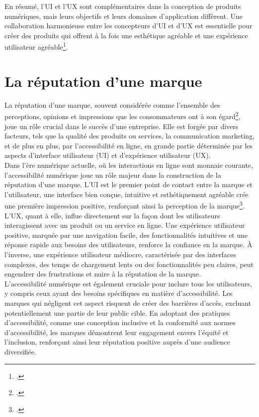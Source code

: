 \documentclass[12pt, a4paper]{report}
\begin{document}
En résumé, l'UI et l'UX sont complémentaires dans la conception de produits numériques, mais leurs objectifs et leurs domaines d'application diffèrent. Une collaboration harmonieuse entre les concepteurs d'UI et d'UX est essentielle pour créer des produits qui offrent à la fois une esthétique agréable et une expérience utilisateur agréable\footcite{ardito_investigating_2014}.

\section{La réputation d'une marque}

La réputation d'une marque, souvent considérée comme l'ensemble des perceptions, opinions et impressions que les consommateurs ont à son égard\footcite{boistel_reputation_2008}, joue un rôle crucial dans le succès d'une entreprise. Elle est forgée par divers facteurs, tels que la qualité des produits ou services, la communication marketing, et de plus en plus, par l'accessibilité en ligne, en grande partie déterminée par les aspects d'interface utilisateur (UI) et d'expérience utilisateur (UX).\\

Dans l'ère numérique actuelle, où les interactions en ligne sont monnaie courante, l'accessibilité numérique joue un rôle majeur dans la construction de la réputation d'une marque. L'UI est le premier point de contact entre la marque et l'utilisateur, une interface bien conçue, intuitive et esthétiquement agréable crée une première impression positive, renforçant ainsi la perception de la marque\footcite{barcella_initiation_nodate}.\\

L'UX, quant à elle, influe directement sur la façon dont les utilisateurs interagissent avec un produit ou un service en ligne. Une expérience utilisateur positive, marquée par une navigation facile, des fonctionnalités intuitives et une réponse rapide aux besoins des utilisateurs, renforce la confiance en la marque. À l'inverse, une expérience utilisateur médiocre, caractérisée par des interfaces complexes, des temps de chargement lents ou des fonctionnalités peu claires, peut engendrer des frustrations et nuire à la réputation de la marque.\\

L'accessibilité numérique est également cruciale pour inclure tous les utilisateurs, y compris ceux ayant des besoins spécifiques en matière d'accessibilité. Les marques qui négligent cet aspect risquent de créer des barrières d'accès, excluant potentiellement une partie de leur public cible. En adoptant des pratiques d'accessibilité, comme une conception inclusive et la conformité aux normes d'accessibilité, les marques démontrent leur engagement envers l'équité et l'inclusion, renforçant ainsi leur réputation positive auprès d'une audience diversifiée.\\
\end{document}
